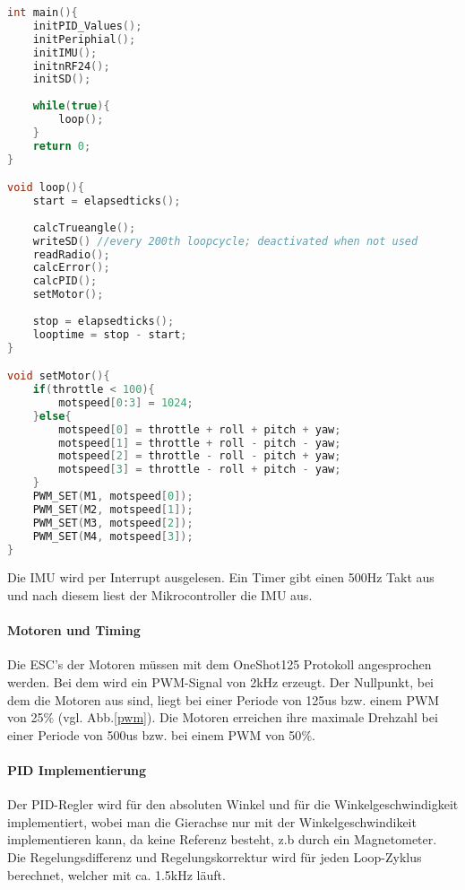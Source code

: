 \documentclass[12pt,a4paper, ngerman]{article}
\begin{document}
\begin{lstlisting}[language=C++,caption=Programmablauf Pseudocode]
int main(){
	initPID_Values();
	initPeriphial();
	initIMU();
	initnRF24();
	initSD();
	
	while(true){
		loop();
	}
	return 0;
}

void loop(){
	start = elapsedticks();
	
	calcTrueangle();
	writeSD() //every 200th loopcycle; deactivated when not used
	readRadio();
	calcError();
	calcPID();
	setMotor();
	
	stop = elapsedticks();
	looptime = stop - start;
}

void setMotor(){
	if(throttle < 100){
		motspeed[0:3] = 1024;	
	}else{
		motspeed[0] = throttle + roll + pitch + yaw; 
		motspeed[1]	= throttle + roll - pitch - yaw;
		motspeed[2]	= throttle - roll - pitch + yaw;
		motspeed[3]	= throttle - roll + pitch - yaw;
	}
	PWM_SET(M1, motspeed[0]);
	PWM_SET(M2, motspeed[1]);
	PWM_SET(M3, motspeed[2]);
	PWM_SET(M4, motspeed[3]);
}
\end{lstlisting}
\noindent
Die IMU wird per Interrupt ausgelesen. Ein Timer gibt einen 500Hz Takt aus und nach diesem liest der Mikrocontroller die IMU aus.
\newpage
\paragraph{Motoren und Timing}
Die ESC's der Motoren müssen mit dem OneShot125 Protokoll\cite{website:OL_OneShot125} angesprochen werden. Bei dem wird ein PWM-Signal von 2kHz erzeugt. Der Nullpunkt, bei dem die Motoren aus sind, liegt bei einer Periode von 125us bzw. einem PWM von 25$\%$ (vgl. Abb.\ref{pwm}). Die Motoren erreichen ihre maximale Drehzahl bei einer Periode von 500us bzw. bei einem PWM von 50$\%$.
\paragraph{PID Implementierung}
Der PID-Regler wird für den absoluten Winkel und für die Winkelgeschwindigkeit implementiert, wobei man die Gierachse nur mit der Winkelgeschwindikeit implementieren kann, da keine Referenz besteht, z.b durch ein Magnetometer. Die Regelungsdifferenz und Regelungskorrektur wird für jeden Loop-Zyklus berechnet, welcher mit ca. 1.5kHz läuft.
\newpage
\end{document}
